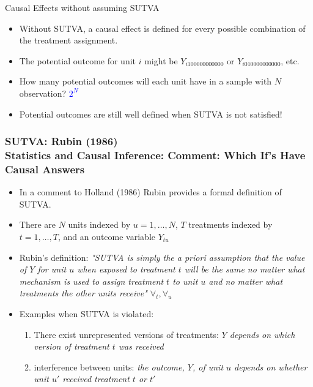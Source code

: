 \documentclass[handout]{beamer}
\theoremstyle{definition}
\begin{document}
	\begin{frame}{Causal Effects without assuming SUTVA}
		\begin{itemize}
			\item Without SUTVA, a causal effect is defined for every possible combination of the treatment assignment.
			\item The potential outcome for unit $i$ might be $Y_{i100000000000}$ or $Y_{i010000000000}$, etc. 
			\item How many potential outcomes will each unit have in a sample with $N$ observation? \pause 
			\textcolor{blue}{$2^N$} 
			\item Potential outcomes are still well defined when SUTVA is not satisfied! 
		\end{itemize}
	\end{frame}

\begin{frame}[t]\frametitle{SUTVA: Rubin (1986) \\ \small 
Statistics and Causal Inference: Comment: Which If's Have Causal Answers}
		\begin{itemize}
			\item<+-> In a comment to Holland (1986) Rubin provides a formal definition of SUTVA.
			\item<+-> There are $N$ units indexed by $u = 1,\dots,N$, $T$ treatments indexed by $t = 1,\dots,T$, and an outcome variable $Y_{tu}$
			\item<+-> Rubin's definition: \textit{"SUTVA is simply the a priori assumption that
the value of $Y$ for unit $u$ when exposed to treatment $t$ will
be the same no matter what mechanism is used to assign
treatment $t$ to unit $u$ and no matter what treatments the
other units receive" $\forall_t, \forall_u$}
		\item<+-> Examples when SUTVA is violated:
		\begin{enumerate}
		\item There exist unrepresented versions of treatments: \emph{$Y$ depends on which version of treatment $t$ was received}
		\item interference between units: \emph{the outcome, $Y$, of unit $u$ depends on whether
unit $u'$ received treatment $t$ or $t'$}
        \end{enumerate}		 
		\end{itemize}
	\end{frame}
\end{document}
